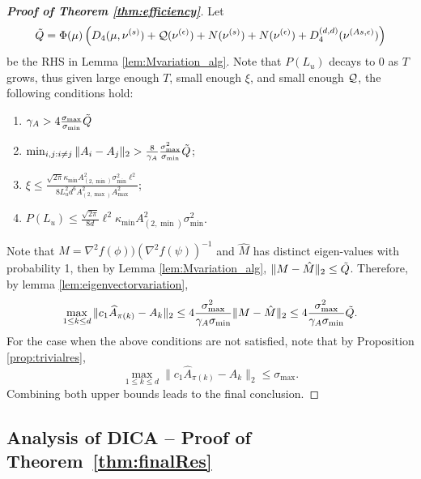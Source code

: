 \begin{proof}[{\bf Proof of Theorem  \ref{thm:efficiency}}]
Let 
 \begin{align*}
\tilde{Q} =\Phi(\mu)\left( D_4(\mu, \nu^{(s)} )+ \mathcal{Q}(\nu^{(\epsilon)}) + N(\nu^{(s)})+ N(\nu^{(\epsilon)})+ D_4^{(d,d)}(\nu^{(As,\epsilon)}) \right)
 \end{align*}
 be the RHS in Lemma \ref{lem:Mvariation_alg}.
 Note that $P(L_u)$ decays to 0 as $T$ grows, thus given large enough $T$, small enough $\xi$, and small enough $\mathcal{Q}$, the following conditions hold:
 \begin{enumerate}
 \item $\gamma_A > 4\frac{\sigma_{\max}}{\sigma_{\min}} \tilde{Q}$
 \item $\min_{i,j:i\neq j} \|A_i - A_j\|_2 > \frac{8}{\gamma_A}\frac{\sigma_{\max}^2}{\sigma_{\min}} \tilde{Q}$;
 \item $\xi \le \frac{\sqrt{2\pi}\kappa_{\min}A^2_{(2,\min)}\sigma_{\min}^2\ell^2}{8L_u^2d^6 A_{(2,\max)}^2A_{\max}^2}$;
 \item  $P(L_u) \le \frac{\sqrt{2\pi}}{8d}\ell^2\kappa_{\min}A^2_{(2,\min)}\sigma_{\min}^2$. 
  \end{enumerate}

Note that $M = \nabla^2f(\phi))(\nabla^2f(\psi))^{-1}$ and $\hat{M}$ has distinct eigen-values with probability 1,  then by Lemma \ref{lem:Mvariation_alg}, $\|M-\hat{M}\|_2 \le \tilde{Q}$.
Therefore, by lemma \ref{lem:eigenvectorvariation}, 
  \[
  \max_{1\le k\le d}\| c_1\widehat{A}_{\pi(k)} - A_k\|_2 \le 4 \frac{\sigma_{\max}^2}{\gamma_A \sigma_{\min}}\|M - \hat{M} \|_2 \le 4 \frac{\sigma_{\max}^2}{\gamma_A \sigma_{\min}} \tilde{Q}. 
  \]
For the case when the above conditions are not satisfied, note that by Proposition \ref{prop:trivialres}, 
\[
  \max_{1\le k\le d}\| c_1\widehat{A}_{\pi(k)} - A_k\|_2 \le\sigma_{\max}.
\]
Combining both upper bounds leads to the final conclusion.
 
\end{proof}

\subsection{Analysis of DICA -- Proof of Theorem~\ref{thm:finalRes}}
\label{subsec:ProofModEff}

